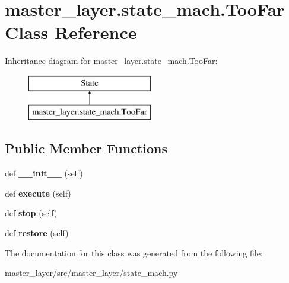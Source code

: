 \hypertarget{classmaster__layer_1_1state__mach_1_1TooFar}{}\section{master\+\_\+layer.\+state\+\_\+mach.\+Too\+Far Class Reference}
\label{classmaster__layer_1_1state__mach_1_1TooFar}
Inheritance diagram for master\+\_\+layer.\+state\+\_\+mach.\+Too\+Far\+:\begin{figure}[H]
\begin{center}
\leavevmode
\includegraphics[height=2.000000cm]{classmaster__layer_1_1state__mach_1_1TooFar}
\end{center}
\end{figure}
\subsection*{Public Member Functions}
\begin{DoxyCompactItemize}
\item 
\mbox{\label{classmaster__layer_1_1state__mach_1_1TooFar_a278c2cc230163ac2daf9777f510cc725}} 
def {\bfseries \+\_\+\+\_\+init\+\_\+\+\_\+} (self)
\item 
\mbox{\label{classmaster__layer_1_1state__mach_1_1TooFar_a1740989b0d8ca92424d5ff736f35fe71}} 
def {\bfseries execute} (self)
\item 
\mbox{\label{classmaster__layer_1_1state__mach_1_1TooFar_a4c12380cb30c43083e18d3d76f806718}} 
def {\bfseries stop} (self)
\item 
\mbox{\label{classmaster__layer_1_1state__mach_1_1TooFar_a5d9dba0d9124d1ccbe898e8371963066}} 
def {\bfseries restore} (self)
\end{DoxyCompactItemize}


The documentation for this class was generated from the following file\+:\begin{DoxyCompactItemize}
\item 
master\+\_\+layer/src/master\+\_\+layer/state\+\_\+mach.\+py\end{DoxyCompactItemize}
